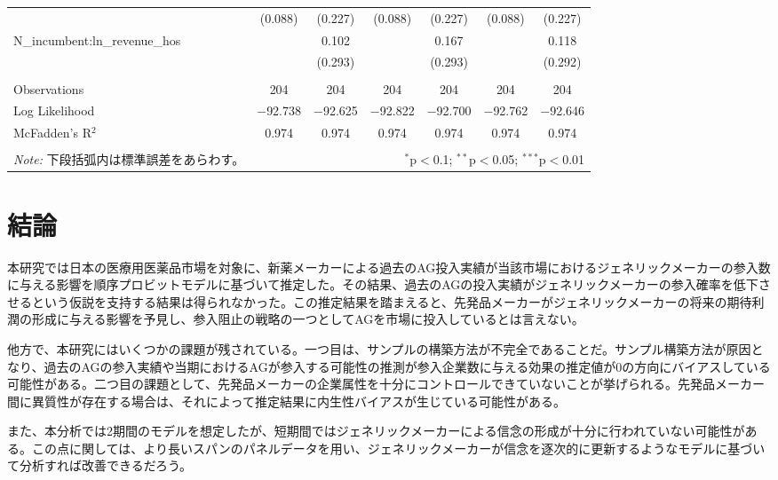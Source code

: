 \documentclass[a4j,10.5pt]{jarticle}
\begin{document}
\begin{table}[!htbp]
{\begin{tabular}{@{\extracolsep{5pt}}lcccccc}
          & (0.088) & (0.227) & (0.088) & (0.227) & (0.088) & (0.227) \\ 
         N\_incumbent:ln\_revenue\_hos &  & 0.102 &  & 0.167 &  & 0.118 \\ 
          &  & (0.293) &  & (0.293) &  & (0.292) \\ 
        \hline \\[-1.8ex] 
        Observations & 204 & 204 & 204 & 204 & 204 & 204 \\ 
        Log Likelihood & $-$92.738 & $-$92.625 & $-$92.822 & $-$92.700 & $-$92.762 & $-$92.646 \\ 
        McFadden's R$^2$ & 0.974 & 0.974 & 0.974 & 0.974 & 0.974 & 0.974 \\ 
        \hline 
        \hline \\[-1.8ex] 
        \textit{Note:} 下段括弧内は標準誤差をあらわす。  & \multicolumn{6}{r}{$^{*}$p$<$0.1; $^{**}$p$<$0.05; $^{***}$p$<$0.01} \\ 
    \end{tabular} 
    }
\end{table}

\section{結論}
本研究では日本の医療用医薬品市場を対象に、新薬メーカーによる過去のAG投入実績が当該市場におけるジェネリックメーカーの参入数に与える影響を順序プロビットモデルに基づいて推定した。その結果、過去のAGの投入実績がジェネリックメーカーの参入確率を低下させるという仮説を支持する結果は得られなかった。この推定結果を踏まえると、先発品メーカーがジェネリックメーカーの将来の期待利潤の形成に与える影響を予見し、参入阻止の戦略の一つとしてAGを市場に投入しているとは言えない。\par
他方で、本研究にはいくつかの課題が残されている。一つ目は、サンプルの構築方法が不完全であることだ。サンプル構築方法が原因となり、過去のAGの参入実績や当期におけるAGが参入する可能性の推測が参入企業数に与える効果の推定値が0の方向にバイアスしている可能性がある。二つ目の課題として、先発品メーカーの企業属性を十分にコントロールできていないことが挙げられる。先発品メーカー間に異質性が存在する場合は、それによって推定結果に内生性バイアスが生じている可能性がある。\par
また、本分析では2期間のモデルを想定したが、短期間ではジェネリックメーカーによる信念の形成が十分に行われていない可能性がある。この点に関しては、より長いスパンのパネルデータを用い、ジェネリックメーカーが信念を逐次的に更新するようなモデルに基づいて分析すれば改善できるだろう。\par
\end{document}
